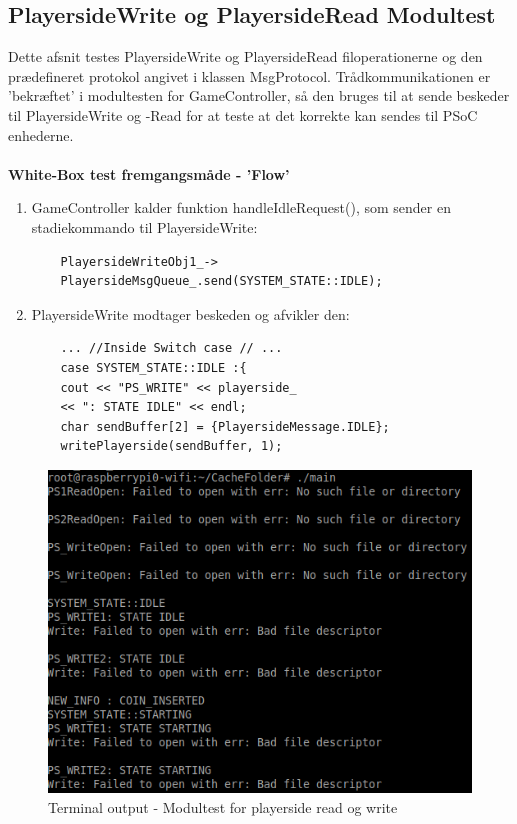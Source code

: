 \documentclass[Modultest/Modultest_main.tex]{subfiles}
\begin{document}
\subsection{PlayersideWrite og PlayersideRead Modultest}
Dette afsnit testes PlayersideWrite og PlayersideRead filoperationerne og den prædefineret protokol angivet i klassen MsgProtocol. Trådkommunikationen er 'bekræftet' i modultesten for GameController, så den bruges til at sende beskeder til PlayersideWrite og -Read for at teste at det korrekte kan sendes til PSoC enhederne. \\\\
\textbf{White-Box test fremgangsmåde - 'Flow'}
\begin{enumerate}
    \item GameController kalder funktion handleIdleRequest(), som sender en stadiekommando til PlayersideWrite: 
    \begin{lstlisting}
    PlayersideWriteObj1_->
    PlayersideMsgQueue_.send(SYSTEM_STATE::IDLE);
    \end{lstlisting}
    \item PlayersideWrite modtager beskeden og afvikler den: 
    \begin{lstlisting}
    ... //Inside Switch case // ... 
    case SYSTEM_STATE::IDLE :{
	cout << "PS_WRITE" << playerside_ 
	<< ": STATE IDLE" << endl;
	char sendBuffer[2] = {PlayersideMessage.IDLE};
	writePlayerside(sendBuffer, 1); 
    \end{lstlisting}
\end{enumerate}
\begin{figure}[H]
    \centering
    \includegraphics[width=\textwidth]{Modultest/GameController/graphic/Modultest_ps.png}
    \caption{Terminal output - Modultest for playerside read og write}
    \label{fig:test_playerside}
\end{figure}
\end{document}
